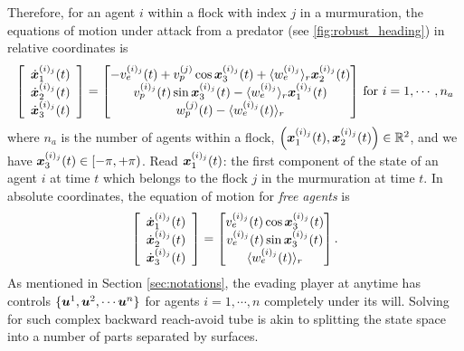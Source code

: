 Therefore, for an agent $i$ within a flock with index $j$ in a murmuration, the equations of motion under attack from a predator (see \autoref{fig:robust_heading}) in relative coordinates is %
%
\begin{align}
\left[\begin{array}{c}
\dot{\state}_1^{(i)_j}(t) \\ \dot{\state}_2^{(i)_j} (t) \\ \dot{\state}_3^{(i)_j} (t)
\end{array}\right] = \begin{bmatrix}
-v_e^{(i)_j}(t) + v_p^{(j)} \cos \state_3^{(i)_j}(t) + \langle w_e^{(i)_j} \rangle_r \state_2^{(i)_j}(t)
%
\\
v_p^{(i)_j}(t)\sin \state_3^{(i)_j}(t) - \langle w_e^{(i)_j} \rangle_r \state_1^{(i)_j}(t)
\\ 
w_p^{(j)}(t) - \langle w_e^{(i)_j}(t) \rangle_r
\end{bmatrix} \, \text{for } i=1,\cdots, n_a
\end{align}
%
where $n_a$ is the number of agents within a flock, $\left(\bm{x}_1^{(i)_j}(t), {\bm{x}}_2^{(i)_j} (t)\right) \in \mathbb{R}^2$, and  we have $\bm{x}_3^{(i)_j} (t) \in \left[-\pi, +\pi\right)$. Read ${\bm{x}}_1^{(i)_j}(t)$: the first component of the state of an agent $i$ at time $t$ which belongs to the flock $j$ in the murmuration at time $t$. In absolute coordinates, the equation of motion for \textit{free agents} is 
%
\begin{align}\left[\begin{array}{c}
		\dot{\bm{x}}_1^{(i)_j}(t) \\ \dot{\bm{x}}_2^{(i)_j} (t) \\ \dot{\bm{x}}_3^{(i)_j} (t)
	\end{array}\right] = \begin{bmatrix}
		v_e^{(i)_j}(t) \cos \bm{x}_3^{(i)_j}(t) 
		\\
		v_e^{(i)_j}(t)\sin \bm{x}_3^{(i)_j}(t) 
		\\ 
		\langle w_e^{(i)_j}(t) \rangle_r
	\end{bmatrix}.
\end{align}
%
As mentioned in Section \ref{sec:notations}, the evading player at anytime has controls $\{\bm{u}^1, \bm{u}^2, \cdots \bm{u}^n\}$ for agents $i=1, \cdots, n$ completely  under its will. Solving for such complex backward reach-avoid tube is akin to splitting the state space into a number of parts separated by surfaces.  


